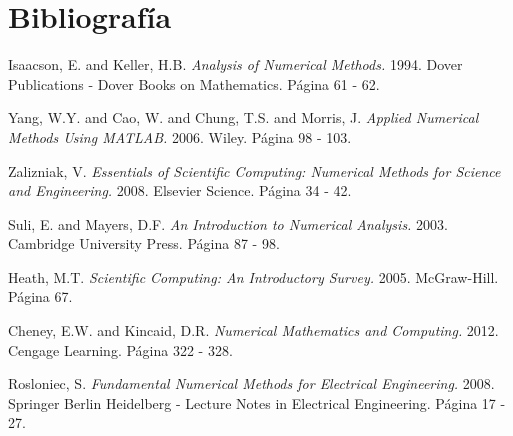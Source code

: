 \documentclass[11pt, spanish]{article}
\begin{document}
\section{Bibliografía}

\begingroup
\renewcommand{\section}[2]{}%
\begin{thebibliography}{}

 Isaacson, E. and Keller, H.B. {\em Analysis of Numerical Methods.} 1994. Dover Publications - Dover Books on Mathematics. Página 61 - 62.

 Yang, W.Y. and Cao, W. and Chung, T.S. and Morris, J. {\em Applied Numerical Methods Using MATLAB.} 2006. Wiley. Página 98 - 103.

 Zalizniak, V. {\em Essentials of Scientific Computing: Numerical Methods for Science and Engineering.} 2008. Elsevier Science. Página 34 - 42.

 Suli, E. and Mayers, D.F. {\em An Introduction to Numerical Analysis.} 2003. Cambridge University Press. Página 87 - 98.

 Heath, M.T. {\em Scientific Computing: An Introductory Survey.} 2005. McGraw-Hill. Página 67.

 Cheney, E.W. and Kincaid, D.R. {\em Numerical Mathematics and Computing.} 2012. Cengage Learning. Página 322 - 328.

 Rosloniec, S. {\em Fundamental Numerical Methods for Electrical Engineering.} 2008. Springer Berlin Heidelberg - Lecture Notes in Electrical Engineering. Página 17 - 27.


\end{thebibliography}
\endgroup

\newpage
\section{Scripts}



\newpage





\newpage



\lstlistoflistings


\end{document}
